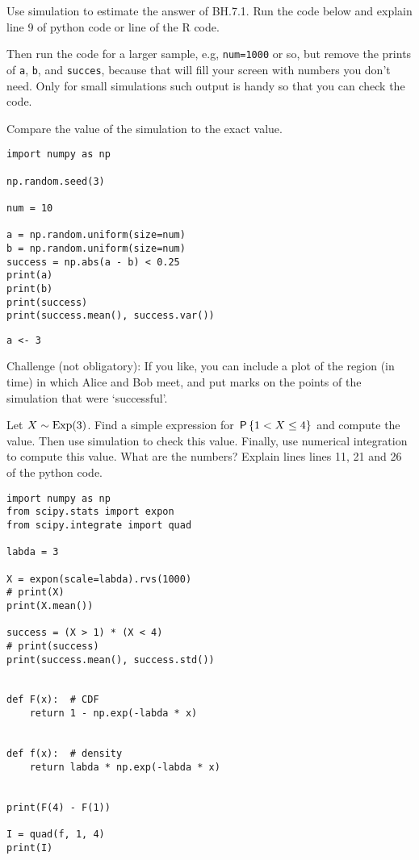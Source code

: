 \documentclass[assignments]{subfiles}
\begin{document}
\begin{exercise} 
Use simulation to estimate the answer of BH.7.1. Run the code below and explain line 9 of python code or line of the R code. 


Then run the code for a larger sample, e.g, \verb|num=1000| or so, but remove the prints of \verb|a|, \verb|b|, and \verb|succes|, because that will fill your screen with numbers you don't need.
Only for small simulations such output is handy so that you can check the code.

Compare the value of the simulation to the exact value.


\begin{verbatim}
import numpy as np

np.random.seed(3)

num = 10

a = np.random.uniform(size=num)
b = np.random.uniform(size=num)
success = np.abs(a - b) < 0.25
print(a)
print(b)
print(success)
print(success.mean(), success.var())
\end{verbatim}


\begin{verbatim}
a <- 3
\end{verbatim}

Challenge (not obligatory): If you like, you can include a plot of the region (in time) in which Alice and Bob meet, and put marks on the points of the simulation that were `successful'. 
\end{exercise}



\begin{exercise}
Let $X\sim\Exp{3}$.
Find a simple expression for $\P{1 < X \leq 4}$ and compute the value.
Then use simulation to check this value.
Finally, use numerical integration to compute this value. What are the numbers? Explain lines lines 11, 21 and 26 of the python code. 

\begin{verbatim}
import numpy as np
from scipy.stats import expon
from scipy.integrate import quad

labda = 3

X = expon(scale=labda).rvs(1000)
# print(X)
print(X.mean())

success = (X > 1) * (X < 4)
# print(success)
print(success.mean(), success.std())


def F(x):  # CDF
    return 1 - np.exp(-labda * x)


def f(x):  # density
    return labda * np.exp(-labda * x)


print(F(4) - F(1))

I = quad(f, 1, 4)
print(I)
\end{verbatim}
\end{exercise}
\end{document}
